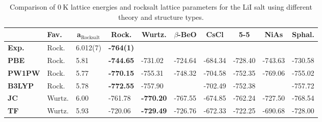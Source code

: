 \documentclass[titlepage,11pt]{article}
\begin{document}
\begin{table}[]
	\begin{tabular}{l|lllllllll}
		& \textbf{Fav.} & \multicolumn{1}{c}{\textbf{a$_{\text{Rocksalt}}$}} & \multicolumn{1}{c}{\textbf{Rock.}} & \multicolumn{1}{c}{\textbf{Wurtz.}} & \multicolumn{1}{c}{\textbf{$\beta$-BeO}} & \multicolumn{1}{c}{\textbf{CsCl}} & \multicolumn{1}{c}{\textbf{5-5}} & \multicolumn{1}{c}{\textbf{NiAs}} & \multicolumn{1}{c}{\textbf{Sphal.}} \\ \hline
		\textbf{Exp.} & Rock. & 6.012(7) & \textbf{-764(1)} &  &  &  &  &  &  \\
		\textbf{PBE} & Rock. & 5.81 & \textbf{-744.65} & -731.02 & -724.64 & -684.34 & -728.40 & -743.63 & -730.58\\
		\textbf{PW1PW} & Rock. & 5.77 & \textbf{-770.15} & -755.31 & -748.32 & -704.58 & -752.35 & -769.06 & -755.02\\
		\textbf{B3LYP} & Rock. & 5.78 & \textbf{-772.55} & -757.90 &   & -702.49 & -752.38 &   & -757.72\\
		\textbf{JC} & Wurtz. & 6.00 & -761.78 & \textbf{-770.20} & -767.55 & -674.85 & -762.24 & -727.50 & -768.54 \\
		\textbf{TF} & Wurtz. & 5.93 & -720.06 & \textbf{-729.49} & -726.76 & -672.33 & -722.25 & -690.68 & -728.00 	
	\end{tabular}
	\caption{\label{tab:LiI} Comparison of $\SI{0}{\kelvin}$ lattice energies and rocksalt lattice parameters for the LiI salt using different theory and structure types.}
\end{table}
%
\end{document}
